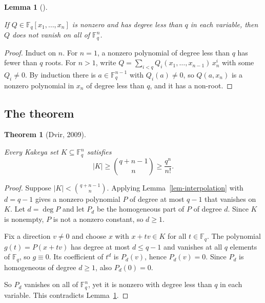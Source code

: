 \documentclass[
  11pt,
]{article}
\newcounter{none} %
\theoremstyle{plain}
\newtheorem{theorem}{Theorem}[section]
\theoremstyle{plain}
\newtheorem{lemma}{Lemma}[section]
\theoremstyle{remark}
\begin{document}
\begin{lemma}[]\protect\hypertarget{lem-nonvanishing}{}\label{lem-nonvanishing}

If \(Q \in \mathbb{F}_q[x_1, \dots, x_n]\) is nonzero and has degree
less than \(q\) in each variable, then \(Q\) does not vanish on all of
\(\mathbb{F}_q^n\).

\end{lemma}

\begin{proof}
Induct on \(n\). For \(n = 1\), a nonzero polynomial of degree less than
\(q\) has fewer than \(q\) roots. For \(n > 1\), write
\(Q = \sum_{i < q} Q_i(x_1, \dots, x_{n-1})\, x_n^i\) with some
\(Q_i \ne 0\). By induction there is \(a \in \mathbb{F}_q^{n-1}\) with
\(Q_i(a) \ne 0\), so \(Q(a, x_n)\) is a nonzero polynomial in \(x_n\) of
degree less than \(q\), and it has a non-root.
\end{proof}

\subsection{The theorem}\label{the-theorem}

\begin{theorem}[Dvir,
2009]\protect\hypertarget{thm-dvir}{}\label{thm-dvir}

Every Kakeya set \(K \subseteq \mathbb{F}_q^n\) satisfies \[
\left|K\right| \ge \binom{q+n-1}{n} \ge \frac{q^n}{n!}.
\]

\end{theorem}

\begin{proof}
Suppose \(\left|K\right| < \binom{q+n-1}{n}\). Applying
Lemma~\ref{lem-interpolation} with \(d = q - 1\) gives a nonzero
polynomial \(P\) of degree at most \(q - 1\) that vanishes on \(K\). Let
\(d = \deg P\) and let \(P_d\) be the homogeneous part of \(P\) of
degree \(d\). Since \(K\) is nonempty, \(P\) is not a nonzero constant,
so \(d \ge 1\).

Fix a direction \(v \ne 0\) and choose \(x\) with \(x + tv \in K\) for
all \(t \in \mathbb{F}_q\). The polynomial \(g(t) = P(x + tv)\) has
degree at most \(d \le q - 1\) and vanishes at all \(q\) elements of
\(\mathbb{F}_q\), so \(g \equiv 0\). Its coefficient of \(t^d\) is
\(P_d(v)\), hence \(P_d(v) = 0\). Since \(P_d\) is homogeneous of degree
\(d \ge 1\), also \(P_d(0) = 0\).

So \(P_d\) vanishes on all of \(\mathbb{F}_q^n\), yet it is nonzero with
degree less than \(q\) in each variable. This contradicts
Lemma~\ref{lem-nonvanishing}.
\end{proof}
\end{document}
